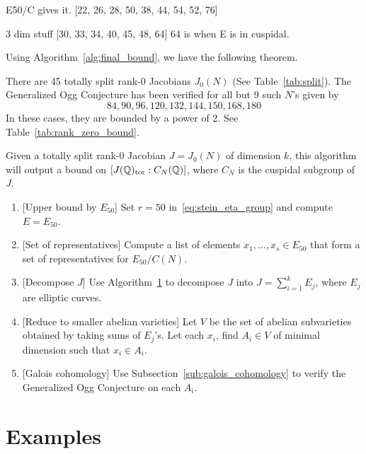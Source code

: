 E50/C gives it.
[22, 26, 28, 50, 38, 44, 54, 52, 76]

3 dim stuff
[30, 33, 34, 40, 45, 48, 64]
64 is when E is in cuspidal.



Using Algorithm~\ref{alg:final_bound}, we have the following theorem.
\begin{theorem}%
    \label{thm:verification_rank_zero}
    There are 45 totally split rank-0 Jacobians $J_0(N)$ (See
    Table~\ref{tab:split}). The Generalized Ogg Conjecture has been verified
    for all but 9 such $N$'s given by
    \[
        84,90,96,120,132,144,150,168,180
    \]
    In these cases, they are bounded by a power of 2. See
    Table~\ref{tab:rank_zero_bound}.
\end{theorem}

\begin{algorithm}%
    Given a totally split rank-0 Jacobian $J=J_0(N)$ of dimension $k$, this
    algorithm will output a bound on $[J(\mathbb{Q})_{\mathrm{tor}}:C_N(\mathbb{Q})]$, where $C_N$ is
    the cuspidal subgroup of $J$.
    \begin{enumerate}
        \item{} [Upper bound by $E_{50}$]
            Set $r=50$ in~\eqref{eq:stein_eta_group} and compute $E=E_{50}$.
        \item{} [Set of representatives]
            Compute a list of elements $x_1,\ldots,x_s\in E_{50}$ that form a
            set of representatives for $E_{50}/C(N)$.
        \item{} [Decompose $J$]
            Use Algorithm~\ref{} to decompose $J$ into $J=\sum_{i=1} ^k E_j$,
            where $E_j$ are elliptic curves. 
        \item{} [Reduce to smaller abelian varieties]
            Let $V$ be the set of abelian subvarieties obtained by taking sums
            of $E_j$'s. Let each $x_i$, find $A_i\in V$ of minimal dimension
            such that $x_i\in A_i$.
        \item{} [Galois cohomology]
            Use Subsection~\ref{sub:galois_cohomology} to verify the
            Generalized Ogg Conjecture on each $A_i$.
    \end{enumerate}
\end{algorithm}

\section{Examples}

